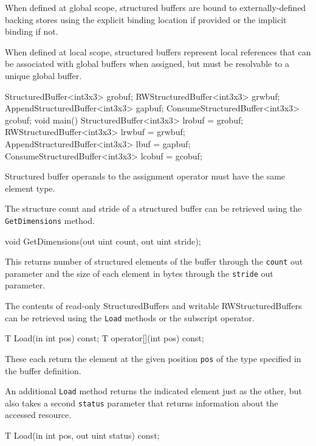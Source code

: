 When defined at global scope, structured buffers are bound to externally-defined backing stores
using the explicit binding location if provided or the implicit binding if not.

When defined at local scope, structured buffers represent local references
that can be associated with global buffers when assigned,
but must be resolvable to a unique global buffer.

\begin{HLSL}
  StructuredBuffer<int3x3> grobuf;
  RWStructuredBuffer<int3x3> grwbuf;
  AppendStructuredBuffer<int3x3> gapbuf;
  ConsumeStructuredBuffer<int3x3> gcobuf;
  void main() {
    StructuredBuffer<int3x3> lrobuf = grobuf;
    RWStructuredBuffer<int3x3> lrwbuf = grwbuf;
    AppendStructuredBuffer<int3x3> lbuf = gapbuf;
    ConsumeStructuredBuffer<int3x3> lcobuf = gcobuf;
  }
\end{HLSL}
Structured buffer operands to the assignment operator must have the same element type.


The structure count and stride of a structured buffer can be retrieved using the \texttt{GetDimensions} method.
\begin{HLSL}
void GetDimensions(out uint count, out uint stride);
\end{HLSL}

This returns number of structured elements of the buffer through the \texttt{count} out parameter
and the size of each element in bytes through the \texttt{stride} out parameter.


The contents of read-only StructuredBuffers and writable RWStructuredBuffers can be retrieved
using the \texttt{Load} methods or the subscript operator.

\begin{HLSL}
 T Load(in int pos) const;
 T operator[](int pos) const;
\end{HLSL}

These each return the element at the given position \texttt{pos} of the type specified in the buffer definition.

An additional \texttt{Load} method returns the indicated element just as the other,
but also takes a second \texttt{status} parameter that returns information about the accessed resource.
\begin{HLSL}
 T Load(in int pos, out uint status) const;
\end{HLSL}

